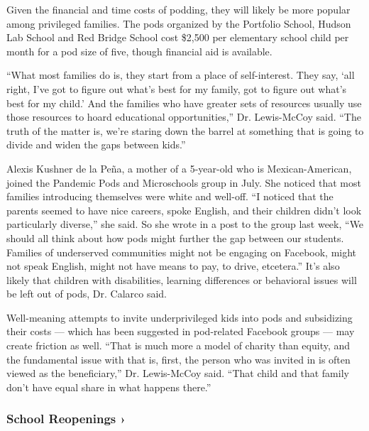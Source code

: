 Given the financial and time costs of podding, they will likely be more
popular among privileged families. The pods organized by the Portfolio
School, Hudson Lab School and Red Bridge School cost \$2,500 per
elementary school child per month for a pod size of five, though
financial aid is available.

``What most families do is, they start from a place of self-interest.
They say, `all right, I've got to figure out what's best for my family,
got to figure out what's best for my child.' And the families who have
greater sets of resources usually use those resources to hoard
educational opportunities,'' Dr. Lewis-McCoy said. ``The truth of the
matter is, we're staring down the barrel at something that is going to
divide and widen the gaps between kids.''

Alexis Kushner de la Peña, a mother of a 5-year-old who is
Mexican-American, joined the Pandemic Pods and Microschools group in
July. She noticed that most families introducing themselves were white
and well-off. ``I noticed that the parents seemed to have nice careers,
spoke English, and their children didn't look particularly diverse,''
she said. So she wrote in a post to the group last week, ``We should all
think about how pods might further the gap between our students.
Families of underserved communities might not be engaging on Facebook,
might not speak English, might not have means to pay, to drive,
etcetera.'' It's also likely that children with disabilities, learning
differences or behavioral issues will be left out of pods, Dr. Calarco
said.

Well-meaning attempts to invite underprivileged kids into pods and
subsidizing their costs --- which has been suggested in pod-related
Facebook groups --- may create friction as well. ``That is much more a
model of charity than equity, and the fundamental issue with that is,
first, the person who was invited in is often viewed as the
beneficiary,'' Dr. Lewis-McCoy said. ``That child and that family don't
have equal share in what happens there.''

\href{https://www.nytimes3xbfgragh.onion/spotlight/schools-reopening?action=click\&pgtype=Article\&state=default\&region=MAIN_CONTENT_3\&context=storylines_keepup}{}

\hypertarget{school-reopenings-}{%
\subsubsection{School Reopenings ›}\label{school-reopenings-}}

